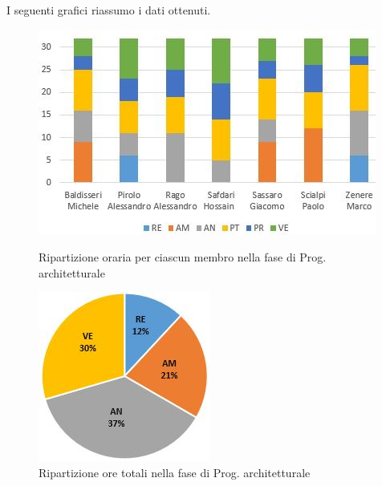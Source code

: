 I seguenti grafici riassumo i dati ottenuti.

\begin{figure}[!htb]
   \begin{minipage}{0.6\textwidth}
     \centering
     \includegraphics{Images/PO-Progettazione}
     \caption{Ripartizione oraria per ciascun membro nella fase di Prog. architetturale}
   \end{minipage}\hspace{0.1\textwidth}
   \begin{minipage}{0.3\textwidth}
     \centering
     \includegraphics[width=.9\textwidth]{Images/PE-Analisi}
     \captionsetup{width=.9\textwidth}
     \caption{Ripartizione ore totali nella fase di Prog. architetturale}
   \end{minipage}
\end{figure}